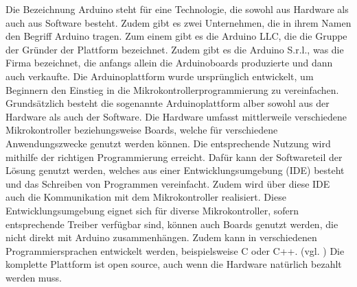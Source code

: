 Die Bezeichnung Arduino steht für eine Technologie, die sowohl aus Hardware als auch aus Software besteht. Zudem gibt es zwei Unternehmen, die in ihrem Namen den Begriff Arduino tragen. Zum einem gibt es die Arduino LLC, die die Gruppe der Gründer der Plattform bezeichnet. Zudem gibt es die Arduino S.r.l., was die Firma bezeichnet, die anfangs allein die Arduinoboards produzierte und dann auch verkaufte. Die Arduinoplattform wurde ursprünglich entwickelt, um Beginnern den Einstieg in die Mikrokontrollerprogrammierung zu vereinfachen. 
Grundsätzlich besteht die sogenannte Arduinoplattform alber sowohl aus der Hardware als auch der Software. Die Hardware umfasst mittlerweile verschiedene Mikrokontroller beziehungsweise Boards, welche für verschiedene Anwendungszwecke genutzt werden können. Die entsprechende Nutzung wird mithilfe der richtigen Programmierung erreicht. Dafür kann der Softwareteil der Lösung genutzt werden, welches aus einer Entwicklungsumgebung (IDE) besteht und das Schreiben von Programmen vereinfacht. Zudem wird über diese IDE auch die Kommunikation mit dem Mikrokontroller realisiert. Diese Entwicklungsumgebung eignet sich für diverse Mikrokontroller, sofern entsprechende Treiber verfügbar sind, können auch Boards genutzt werden, die nicht direkt mit Arduino zusammenhängen. Zudem kann in verschiedenen Programmiersprachen entwickelt werden, beispielsweise C oder C++. (vgl. \cite{.h,.f,.e,.i,.g,online.})
Die komplette Plattform ist open source, auch wenn die Hardware natürlich bezahlt werden muss. 